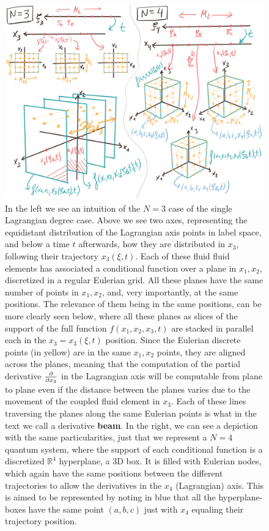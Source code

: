 \documentclass[11pt, a4paper]{article} %
\newcommand{\R}{\mathbb{R}} %
\begin{document}
\begin{figure}[p!]
  \centering
    \includegraphics[width=1\linewidth]{11one_Lagrangian.png}
  \caption{In the left we see an intuition of the $N=3$ case of the single Lagrangian degree case. Above we see two axes, representing the equidistant distribution of the Lagrangian axis points in label space, and below a time $t$ afterwards, how they are distributed in $x_3$, following their trajectory $x_3(\xi,t)$. Each of these fluid fluid elements has associated a conditional function over a plane in $x_1,x_2$, discretized in a regular Eulerian grid. All these planes have the same number of points in $x_1,x_2$, and, very importantly, at the same positions. The relevance of them being in the same positions, can be more clearly seen below, where all these planes as slices of the support of the full function $f(x_1,x_2,x_3,t)$ are stacked in parallel each in the $x_3=x_3(\xi,t)$ position. Since the Eulerian discrete points (in yellow) are in the same $x_1,x_2$ points, they are aligned across the planes, meaning that the computation of the partial derivative $\pdv{}{x_3}$ in the Lagrangian axis will be computable from plane to plane even if the distance between the planes varies due to the movement of the coupled fluid element in $x_3$. Each of these lines traversing the planes along the same Eulerian points is what in the text we call a derivative {\bf beam}. In the right, we can see a depiction with the same particularities, just that we represent a $N=4$ quantum system, where the support of each conditional function is a discretized $\R^4$ hyperplane, a 3D box. It is filled with Eulerian nodes, which again have the same positions between the different trajectories to allow the derivatives in the $x_4$ (Lagrangian) axis. This is aimed to be represented by noting in blue that all the hyperplane-boxes have the same point $(a,b,c)$ just with $x_4$ equaling their trajectory position. }
  \label{fig:hyperplane}
\end{figure}
\end{document}

